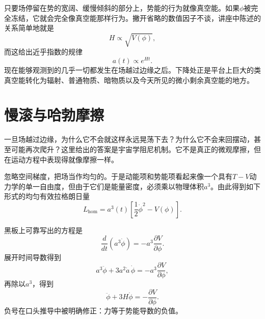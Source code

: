 只要场停留在势的宽阔、缓慢倾斜的部分上，势能的行为就像真空能。如果\(\phi\)被完全冻结，它就会完全像真空能那样行为。撇开省略的数值因子不谈，讲座中陈述的关系简单地就是
\begin{equation}
H\propto \sqrt{V(\phi)},
\end{equation}
而这给出近乎指数的规律
\begin{equation}
a(t)\propto e^{Ht}.
\end{equation}
现在能够观测到的几乎一切都发生在场越过边缘之后。下降处正是平台上巨大的类真空能转化为辐射、普通物质、暗物质以及今天所见的微小剩余真空能的地方。

\begin{classroomqa}
\end{classroomqa}

\begin{classroomqa}
\end{classroomqa}

\section{慢滚与哈勃摩擦}

一旦场越过边缘，为什么它不会就这样永远晃荡下去？为什么它不会来回摆动，甚至可能再次爬升？这里给出的答案是宇宙学阻尼机制。它不是真正的微观摩擦，但在运动方程中表现得就像摩擦一样。

忽略空间梯度，把场当作均匀的。于是动能项和势能项看起来像一个具有\(T-V\)动力学的单一自由度，但由于它们是能量密度，必须乘以物理体积\(a^3\)。由此得到如下形式的均匀有效拉格朗日量
\begin{equation}
L_{\mathrm{hom}}=a^3(t)\left[\frac12\dot\phi^2-V(\phi)\right].
\end{equation}

黑板上可靠写出的方程是
\begin{equation}
\frac{d}{dt}\left(a^3\dot\phi\right)=-a^3\frac{\partial V}{\partial\phi}.
\end{equation}
展开时间导数得到
\begin{equation}
a^3\ddot\phi+3a^2\dot a\,\dot\phi=-a^3\frac{\partial V}{\partial\phi},
\end{equation}
再除以\(a^3\)，得到
\begin{equation}
\ddot\phi+3H\dot\phi=-\frac{\partial V}{\partial\phi}.
\end{equation}
负号在口头推导中被明确修正：力等于势能导数的负值。

